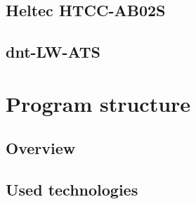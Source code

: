 
\subsection{Heltec HTCC-AB02S}


\subsection{dnt-LW-ATS}


\section{Program structure}

\subsection{Overview}

\subsection{Used technologies}

